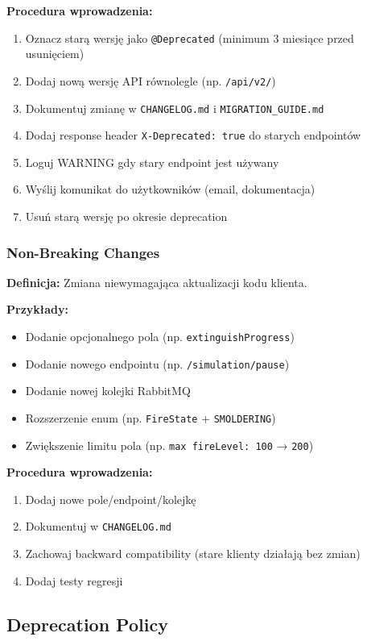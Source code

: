 \documentclass[11pt,a4paper] {article}
\begin{document}
\textbf{Procedura wprowadzenia:}
\begin{enumerate}
    \item Oznacz starą wersję jako \texttt{@Deprecated} (minimum 3 miesiące przed usunięciem)
    \item Dodaj nową wersję API równolegle (np. \texttt{/api/v2/})
    \item Dokumentuj zmianę w \texttt{CHANGELOG.md} i \texttt{MIGRATION\_GUIDE.md}
    \item Dodaj response header \texttt{X-Deprecated: true} do starych endpointów
    \item Loguj WARNING gdy stary endpoint jest używany
    \item Wyślij komunikat do użytkowników (email, dokumentacja)
    \item Usuń starą wersję po okresie deprecation
\end{enumerate}

\subsubsection{Non-Breaking Changes}

\textbf{Definicja:} Zmiana niewymagająca aktualizacji kodu klienta.

\textbf{Przykłady:}
\begin{itemize}
    \item Dodanie opcjonalnego pola (np. \texttt{extinguishProgress})
    \item Dodanie nowego endpointu (np. \texttt{/simulation/pause})
    \item Dodanie nowej kolejki RabbitMQ
    \item Rozszerzenie enum (np. \texttt{FireState} + \texttt{SMOLDERING})
    \item Zwiększenie limitu pola (np. \texttt{max fireLevel: 100} → \texttt{200})
\end{itemize}

\textbf{Procedura wprowadzenia:}
\begin{enumerate}
    \item Dodaj nowe pole/endpoint/kolejkę
    \item Dokumentuj w \texttt{CHANGELOG.md}
    \item Zachowaj backward compatibility (stare klienty działają bez zmian)
    \item Dodaj testy regresji
\end{enumerate}

\subsection{Deprecation Policy}
\end{document}
